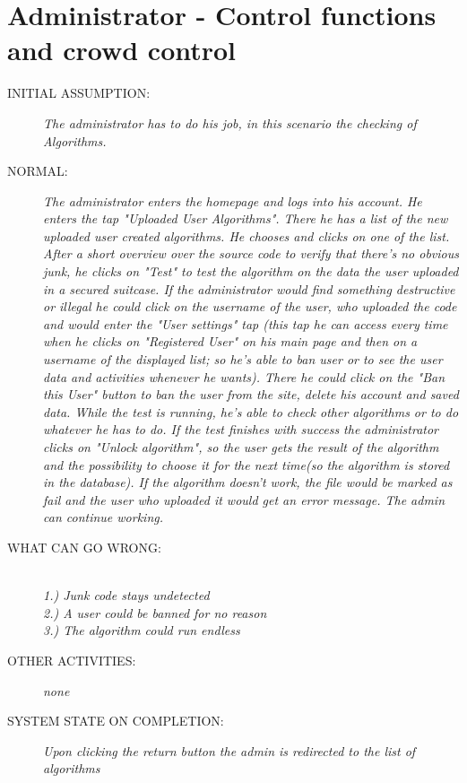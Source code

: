\section{Administrator - Control functions and crowd control}
\begin{description}
  \item [INITIAL ASSUMPTION:]
    \textit{The administrator has to do his job, in this scenario the checking of Algorithms.}
  \item [NORMAL:]
    \textit{The administrator enters the homepage and logs into his account. He enters the tap "Uploaded User Algorithms". There he has a list of the new uploaded user created algorithms. He chooses and clicks on one of the list. After a short overview over the source code to verify that there’s no obvious junk, he clicks on "Test" to test the algorithm on the data the user uploaded in a secured suitcase. If the administrator would find something destructive or illegal he could click on the username of the user, who uploaded the code and would enter the "User settings" tap (this tap he can access every time when he clicks on "Registered User" on his main page and then on a username of the displayed list; so he’s able to ban user or to see the user data and activities whenever he wants). There he could click on the "Ban this User" button to ban the user from the site, delete his account and saved data. While the test is running, he’s able to check other algorithms or to do whatever he has to do. If the test finishes with success the administrator clicks on "Unlock algorithm", so the user gets the result of the algorithm and the possibility to choose it for the next time(so the algorithm is stored in the database). If the algorithm doesn’t work, the file would be marked as fail and the user who uploaded it would get an error message.
The admin can continue working.}
  \item [WHAT CAN GO WRONG:]
    \textit{\\1.) Junk code stays undetected
\\2.) A user could be banned for no reason
\\3.) The algorithm could run endless  
}
  \item [OTHER ACTIVITIES:]
    \textit{none}
  \item [SYSTEM STATE ON COMPLETION:]
    \textit{Upon clicking the return button the admin is redirected to the list of algorithms}
\end{description}

